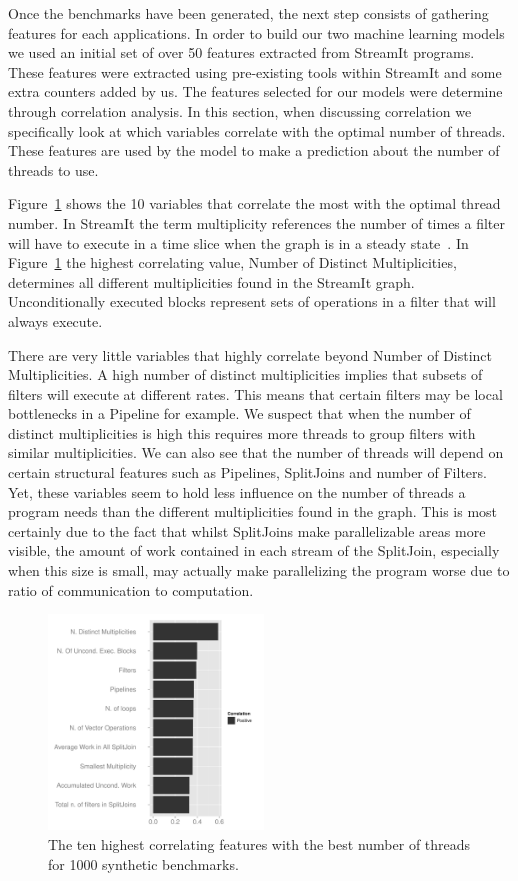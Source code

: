 Once the benchmarks have been generated, the next step consists of gathering features for each applications.
In order to build our two machine learning models we used an initial set of over 50 features extracted from StreamIt programs.
These features were extracted using pre-existing tools within StreamIt and some extra counters added by us.
The features selected for our models were determine through correlation analysis.
In this section, when discussing correlation we specifically look at which variables correlate with the optimal number of threads.
These features are used by the model to make a prediction about the number of threads to use.

Figure~\ref{fig:corr} shows the 10 variables that correlate the most with the optimal thread number.
In StreamIt the term multiplicity references the number of times a filter will have to execute in a time slice when the graph is in a steady state~\cite{gordon2002streamcomp}.
In Figure~\ref{fig:corr} the highest correlating value, Number of Distinct Multiplicities, determines all different multiplicities found in the StreamIt graph.
Unconditionally executed blocks represent sets of operations in a filter that will always execute.

There are very little variables that highly correlate beyond Number of Distinct Multiplicities.
A high number of distinct multiplicities implies that subsets of filters will execute at different rates.
This means that certain filters may be local bottlenecks in a Pipeline for example.
We suspect that when the number of distinct multiplicities is high this requires more threads to group filters with similar multiplicities.
We can also see that the number of threads will depend on certain structural features such as Pipelines, SplitJoins and number of Filters.
Yet, these variables seem to hold less influence on the number of threads a program needs than the different multiplicities found in the graph.
This is most certainly due to the fact that whilst SplitJoins make parallelizable areas more visible, the amount of work contained in each stream of the SplitJoin, especially when this size is small, may actually make parallelizing the program worse due to ratio of communication to computation.

\begin{figure}
  \includegraphics[width=0.51\textwidth]{graphics/corrGraph.pdf}
  \caption{The ten highest correlating features with the best number of threads for 1000 synthetic benchmarks.}\label{fig:corr}
\vspace{4mm}
\end{figure}

